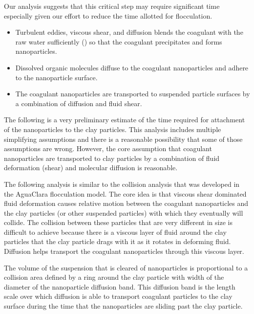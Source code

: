\documentclass[letterpaper,10pt,english]{sphinxmanual}
\begin{document}
Our analysis suggests that this critical step may require significant time especially given our effort to reduce the time allotted for flocculation.
\begin{itemize}
\item {} 
Turbulent eddies, viscous shear, and diffusion blends the coagulant with the raw water sufficiently ({\hyperref[\detokenize{Rapid_Mix/RM_Intro:heading-mixing-time}]{}}) so that the coagulant precipitates and forms nanoparticles.

\item {} 
Dissolved organic molecules diffuse to the coagulant nanoparticles and adhere to the nanoparticle surface.

\item {} 
The coagulant nanoparticles are transported to suspended particle surfaces by a combination of diffusion and fluid shear.

\end{itemize}

The following is a very preliminary estimate of the time required for attachment of the nanoparticles to the clay particles. This analysis includes multiple simplifying assumptions and there is a reasonable possibility that some of those assumptions are wrong. However, the core assumption that coagulant nanoparticles are transported to clay particles by a combination of fluid deformation (shear) and molecular diffusion is reasonable.

The following analysis is similar to the collision analysis that was developed in the AguaClara flocculation model. The core idea is that viscous shear dominated fluid deformation causes relative motion between the coagulant nanoparticles and the clay particles (or other suspended particles) with which they eventually will collide. The collision between these particles that are very different in size is difficult to achieve because there is a viscous layer of fluid around the clay particles that the clay particle drags with it as it rotates in deforming fluid. Diffusion helps transport the coagulant nanoparticles through this viscous layer.

The volume of the suspension that is cleared of nanoparticles is proportional to a collision area defined by a ring around the clay particle with width of the diameter of the nanoparticle diffusion band. This diffusion band is the length scale over which diffusion is able to transport coagulant particles to the clay surface during the time that the nanoparticles are sliding past the clay particle.
\end{document}

